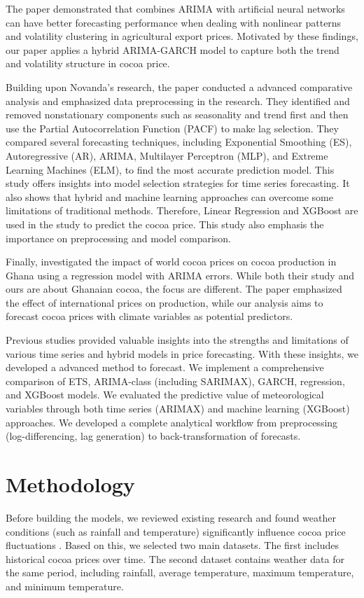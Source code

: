 \documentclass[10pt]{article}
\begin{document}
\noindent
The paper \cite{spices} demonstrated that combines ARIMA with artificial neural networks can have better forecasting performance when dealing with nonlinear patterns and volatility clustering in agricultural export prices. Motivated by these findings, our paper applies a hybrid ARIMA-GARCH model to capture both the trend and volatility structure in cocoa price.

\noindent
Building upon Novanda's research, the paper \cite{coffee1} conducted a advanced comparative analysis and emphasized data preprocessing in the research. They identified and removed nonstationary components such as seasonality and trend first and then use the Partial Autocorrelation Function (PACF) to make lag selection. They compared several forecasting techniques, including Exponential Smoothing (ES), Autoregressive (AR), ARIMA, Multilayer Perceptron (MLP), and Extreme Learning Machines (ELM), to find the most accurate prediction model. This study offers insights into model selection strategies for time series forecasting. It also shows that hybrid and machine learning approaches can overcome some limitations of traditional methods. Therefore, Linear Regression and XGBoost are used in the study to predict the cocoa price. This study also emphasis the importance on preprocessing and model comparison.

\noindent
Finally, \cite{cocoa} investigated the impact of world cocoa prices on cocoa production in Ghana using a regression model with ARIMA errors. While both their study and ours are about Ghanaian cocoa, the focus are different. The paper \cite{cocoa} emphasized the effect of international prices on production, while our analysis aims to forecast cocoa prices with climate variables as potential predictors.

\noindent
Previous studies provided valuable insights into the strengths and limitations of various time series and hybrid models in price forecasting. With these insights, we developed a advanced method to forecast. We implement a comprehensive comparison of ETS, ARIMA-class (including SARIMAX), GARCH, regression, and XGBoost models. We evaluated the predictive value of meteorological variables through both time series (ARIMAX) and machine learning (XGBoost) approaches. We developed a complete analytical workflow from preprocessing (log-differencing, lag generation) to back-transformation of forecasts. 

\newpage

\section{Methodology}
Before building the models, we reviewed existing research and found weather conditions (such as rainfall and temperature) significantly influence cocoa price fluctuations \cite{whepri}. Based on this, we selected two main datasets. The first includes historical cocoa prices over time. The second dataset contains weather data for the same period, including rainfall, average temperature, maximum temperature, and minimum temperature. 
\end{document}
